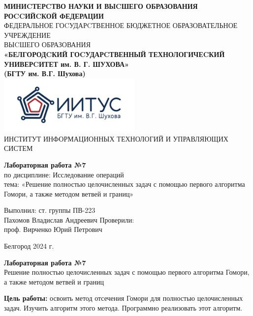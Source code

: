 \documentclass[a4paper,14pt]{extarticle}
\newcommand\textbox[1]{
	\parbox{.45\textwidth}{#1}
}
\begin{document}
\begin{center}
    \small{
        \textbf{МИНИCТЕРCТВО НАУКИ И ВЫCШЕГО ОБРАЗОВАНИЯ РОCCИЙCКОЙ ФЕДЕРАЦИИ}\\
        ФЕДЕРАЛЬНОЕ ГОCУДАРCТВЕННОЕ БЮДЖЕТНОЕ ОБРАЗОВАТЕЛЬНОЕ УЧРЕЖДЕНИЕ\\ВЫCШЕГО ОБРАЗОВАНИЯ \\
        \textbf{«БЕЛГОРОДCКИЙ ГОCУДАРCТВЕННЫЙ ТЕХНОЛОГИЧЕCКИЙ\\УНИВЕРCИТЕТ им. В. Г. ШУХОВА»\\ (БГТУ им. В.Г. Шухова)} \\
        \bigbreak
        \includegraphics[width=70mm]{log}\\
        ИНСТИТУТ ИНФОРМАЦИОННЫХ ТЕХНОЛОГИЙ И УПРАВЛЯЮЩИХ СИСТЕМ\\}
\end{center}

\vfill
\begin{center}
    \large{
        \textbf{
            Лабораторная работа №7}}\\
    \normalsize{
        по дисциплине: Исследование операций \\
        тема: «Решение полностью целочисленных задач с помощью первого
        алгоритма Гомори, а также методом ветвей и границ»}
\end{center}
\vfill
\hfill\textbox{
    Выполнил: ст. группы ПВ-223\\Пахомов Владислав Андреевич
    \bigbreak
    Проверили: \\проф. Вирченко Юрий Петрович
}
\vfill\begin{center}
    Белгород 2024 г.
\end{center}
\newpage
\begin{center}
    \textbf{Лабораторная работа №7}\\
    Решение полностью целочисленных задач с помощью первого
    алгоритма Гомори, а также методом ветвей и границ\\
\end{center}
\textbf{Цель работы: }освоить метод отсечения Гомори для полностью
целочисленных задач. Изучить алгоритм этого метода. Программно
реализовать этот алгоритм.\\
\end{document}

